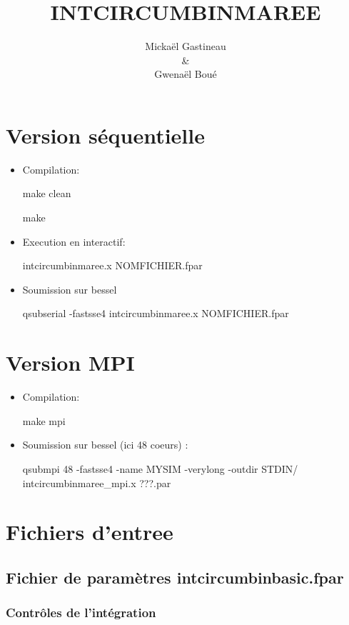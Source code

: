 \documentclass[11pt]{article}
\title{INTCIRCUMBINMAREE}
\author{Micka\"el Gastineau \\ \& \\ Gwena\"el Bou\'e}
\begin{document}
\maketitle

\section{Version s\'equentielle}

\begin{itemize}
 \item Compilation:  
 
make clean

make
 
\item Execution en interactif: 

intcircumbinmaree.x  NOMFICHIER.fpar
\item Soumission sur bessel

qsubserial -fastsse4 intcircumbinmaree.x  NOMFICHIER.fpar
\end{itemize}

\section{Version MPI}

\begin{itemize}
 \item Compilation:  
 
 make mpi
 
\item Soumission sur bessel (ici 48 coeurs) : 

qsubmpi 48 -fastsse4 -name MYSIM -verylong -outdir STDIN/ intcircumbinmaree\_mpi.x  ???.par

\end{itemize}


\section{Fichiers d'entree}

\subsection{Fichier de param\`etres  intcircumbinbasic.fpar}

\subsubsection*{Contr\^oles de l'int\'egration}
\end{document}
